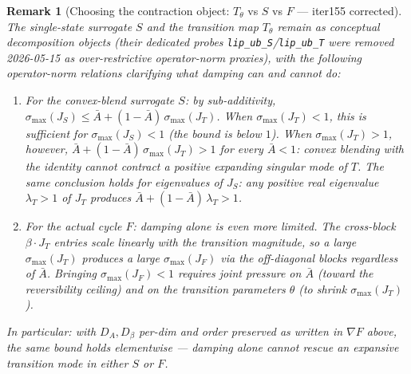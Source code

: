 \documentclass[11pt]{article}
\newtheorem{remark}[theorem]{Remark}
\begin{document}
\begin{remark}[Choosing the contraction object: $T_\theta$ vs $S$ vs $F$ — iter155 corrected]
The single-state surrogate $S$ and the transition map $T_\theta$ remain
as conceptual decomposition objects (their dedicated probes
\texttt{lip\_ub\_S}/\texttt{lip\_ub\_T} were removed 2026-05-15 as
over-restrictive operator-norm proxies), with the following
operator-norm relations clarifying what damping can and cannot do:

\begin{enumerate}[leftmargin=2em,itemsep=0.2em]
  \item \emph{For the convex-blend surrogate $S$}: by sub-additivity,
    $\sigma_{\max}(J_S) \le \bar A + (1-\bar A)\,\sigma_{\max}(J_T)$.  When
    $\sigma_{\max}(J_T) < 1$, this is sufficient for $\sigma_{\max}(J_S) < 1$
    (the bound is below $1$).  When $\sigma_{\max}(J_T) > 1$, however,
    $\bar A + (1-\bar A)\,\sigma_{\max}(J_T) > 1$ for every $\bar A < 1$:
    convex blending with the identity \emph{cannot} contract a positive
    expanding singular mode of $T$.  The same conclusion holds for
    eigenvalues of $J_S$: any positive real eigenvalue $\lambda_T > 1$ of
    $J_T$ produces $\bar A + (1-\bar A)\,\lambda_T > 1$.
  \item \emph{For the actual cycle $F$}: damping alone is even more limited.
    The cross-block $\beta\cdot J_T$ entries scale linearly with the
    transition magnitude, so a large $\sigma_{\max}(J_T)$ produces
    a large $\sigma_{\max}(J_F)$ via the off-diagonal blocks regardless
    of $\bar A$.  Bringing $\sigma_{\max}(J_F) < 1$ requires \emph{joint}
    pressure on $\bar A$ (toward the reversibility ceiling) \emph{and} on
    the transition parameters $\theta$ (to shrink $\sigma_{\max}(J_T)$).
\end{enumerate}

In particular: with $D_A, D_\beta$ per-dim and order preserved as written
in $\nabla F$ above, the same bound holds elementwise — damping alone
cannot rescue an expansive transition mode in either $S$ or $F$.


\end{remark}
\end{document}
